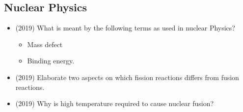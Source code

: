 \documentclass{article}
\begin{document}
\subsection{Nuclear Physics}
\begin{itemize}
\item (2019)  What is meant by the following terms as used in nuclear Physics?
 \begin{itemize}
\item Mass defect 
\item Binding energy. 
\end{itemize}
\item (2019)  Elaborate two aspects on which fission reactions differs from fusion reactions.
\item (2019)  Why is high temperature required to cause nuclear fusion? 
\end{itemize}
\end{document}

